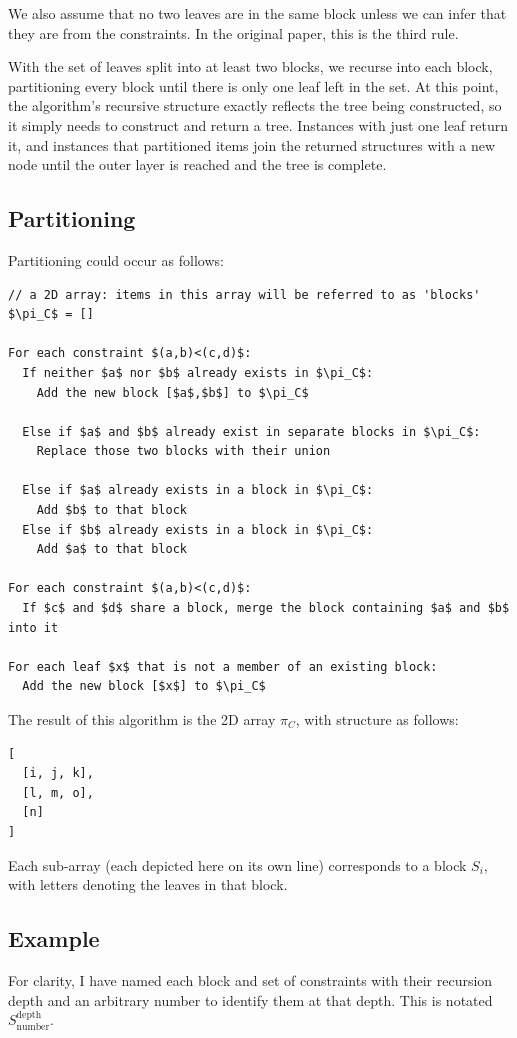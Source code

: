 \documentclass[11pt]{article} %
\begin{document}
We also assume that no two leaves are in the same block unless we can infer that they are from the constraints. In the original paper, this is the third rule.

With the set of leaves split into at least two blocks, we recurse into each block, partitioning every block until there is only one leaf left in the set. At this point, the algorithm's recursive structure exactly reflects the tree being constructed, so it simply needs to construct and return a tree. Instances with just one leaf return it, and instances that partitioned items join the returned structures with a new node until the outer layer is reached and the tree is complete.


\subsection{Partitioning}
Partitioning could occur as follows:
\begin{lstlisting}
// a 2D array: items in this array will be referred to as 'blocks'
$\pi_C$ = []

For each constraint $(a,b)<(c,d)$:
  If neither $a$ nor $b$ already exists in $\pi_C$:
    Add the new block [$a$,$b$] to $\pi_C$

  Else if $a$ and $b$ already exist in separate blocks in $\pi_C$:
    Replace those two blocks with their union

  Else if $a$ already exists in a block in $\pi_C$:
    Add $b$ to that block
  Else if $b$ already exists in a block in $\pi_C$:
    Add $a$ to that block

For each constraint $(a,b)<(c,d)$:
  If $c$ and $d$ share a block, merge the block containing $a$ and $b$ into it

For each leaf $x$ that is not a member of an existing block:
  Add the new block [$x$] to $\pi_C$
\end{lstlisting}

The result of this algorithm is the 2D array $\pi_C$, with structure as follows:
\begin{lstlisting}
[
  [i, j, k],
  [l, m, o],
  [n]
]
\end{lstlisting}
Each sub-array (each depicted here on its own line) corresponds to a block $S_i$, with letters denoting the leaves in that block.


\subsection{Example}
For clarity, I have named each block and set of constraints with their recursion depth and an arbitrary number to identify them at that depth. This is notated $S_\text{number}^\text{depth}$.
\end{document}
